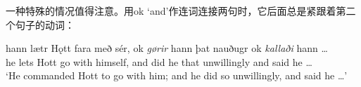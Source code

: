 一种特殊的情况值得注意。用ok `and‌’作连词连接两句时，它后面总是紧跟着第二个句子的动词：
\begin{exe}
\ex \gll
hann	lætr	Hǫtt	fara	með	sér,	ok	\textit{gørir}	hann þat	nauðugr	ok	\textit{kallaði}	hann	…	\\	he	lets	Hott	go	with	himself,	and	did	he
that	unwillingly	and	said	he	…\\	
\trans `He commanded Hott to go with him; and he did so unwillingly, and said he …‌’
\end{exe}







